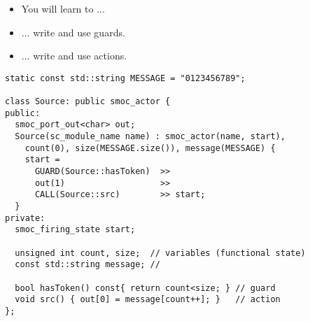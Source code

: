 \begin{frame}
\begin{itemize}
\item You will learn to ...
\item ... write and use guards.
\item ... write and use actions.
\end{itemize}
\end{frame}




\begin{frame}[fragile=singleslide]
\begin{lstlisting}
static const std::string MESSAGE = "0123456789";

class Source: public smoc_actor {
public:
  smoc_port_out<char> out;
  Source(sc_module_name name) : smoc_actor(name, start),
    count(0), size(MESSAGE.size()), message(MESSAGE) {
    start = 
      GUARD(Source::hasToken)  >>
      out(1)                   >>
      CALL(Source::src)        >> start;
  }
private:
  smoc_firing_state start;

  unsigned int count, size;  // variables (functional state)
  const std::string message; //

  bool hasToken() const{ return count<size; } // guard
  void src() { out[0] = message[count++]; }   // action
};

\end{lstlisting}
\end{frame}






